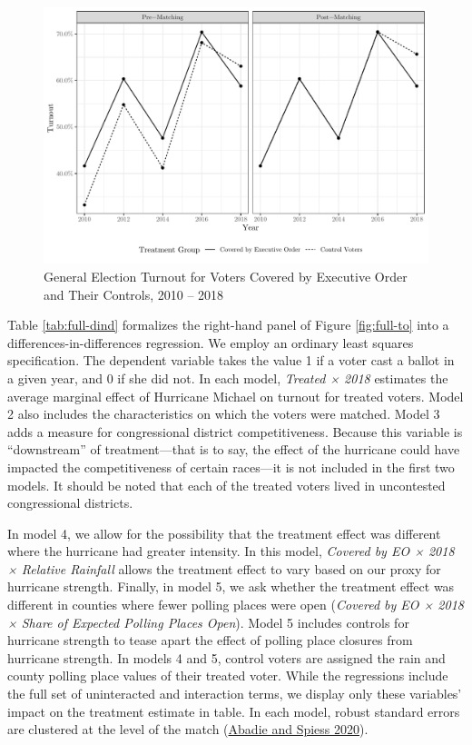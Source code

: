 \documentclass[
  12pt,
]{article}
\begin{document}
\begin{figure}[h]

{\centering \includegraphics{hurricane_michael_files/figure-latex/full-to-chunk-1} 

}

\caption{\label{fig:full-to}General Election Turnout for Voters Covered by Executive Order and Their Controls, 2010 -- 2018}\label{fig:full-to-chunk}
\end{figure}

Table \ref{tab:full-dind} formalizes the right-hand panel of Figure \ref{fig:full-to} into a differences-in-differences regression. We employ an ordinary least squares specification. The dependent variable takes the value 1 if a voter cast a ballot in a given year, and 0 if she did not. In each model, \emph{Treated × 2018} estimates the average marginal effect of Hurricane Michael on turnout for treated voters. Model 2 also includes the characteristics on which the voters were matched. Model 3 adds a measure for congressional district competitiveness. Because this variable is ``downstream'' of treatment---that is to say, the effect of the hurricane could have impacted the competitiveness of certain races---it is not included in the first two models. It should be noted that each of the treated voters lived in uncontested congressional districts.

In model 4, we allow for the possibility that the treatment effect was different where the hurricane had greater intensity. In this model, \emph{Covered by EO × 2018 × Relative Rainfall} allows the treatment effect to vary based on our proxy for hurricane strength. Finally, in model 5, we ask whether the treatment effect was different in counties where fewer polling places were open (\emph{Covered by EO × 2018 × Share of Expected Polling Places Open}). Model 5 includes controls for hurricane strength to tease apart the effect of polling place closures from hurricane strength. In models 4 and 5, control voters are assigned the rain and county polling place values of their treated voter. While the regressions include the full set of uninteracted and interaction terms, we display only these variables' impact on the treatment estimate in table. In each model, robust standard errors are clustered at the level of the match (\protect\hyperlink{ref-Abadie2020}{Abadie and Spiess 2020}).
\end{document}
